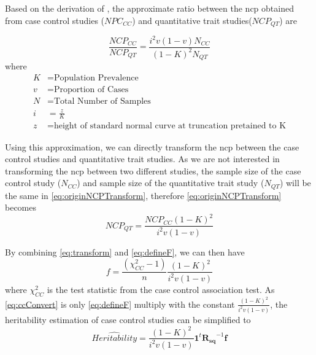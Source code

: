 \documentclass[12pt]{scrbook}
\begin{document}
Based on the derivation of \citet{Yang2010}, the approximate ratio between the \gls{ncp} obtained from case control studies ($NPC_{CC}$) and quantitative trait studies($NCP_{QT}$) are

\begin{equation}
\frac{NCP_{CC}}{NCP_{QT}} = \frac{i^2v(1-v)N_{CC}}{(1-K)^2N_{QT}}
\label{eq:originNCPTransform}
\end{equation}
where
\begin{align*}
K &= \text{Population Prevalence} \\
v &= \text{Proportion of Cases}\\
N &= \text{Total Number of Samples}\\
i &= \frac{z}{K}\\
z &= \text{height of standard normal curve at truncation pretained to K}
\end{align*}

Using this approximation, we can directly transform the \gls{ncp} between the case control studies and quantitative trait studies.
As we are not interested in transforming the \gls{ncp} between two different studies, the sample size of the case control study ($N_{CC}$) and sample size of the quantitative trait study ($N_{QT}$) will be the same in \cref{eq:originNCPTransform}, therefore \cref{eq:originNCPTransform} becomes
\begin{equation}
NCP_{QT} = \frac{NCP_{CC}(1-K)^2}{i^2v(1-v)}
\label{eq:transform}
\end{equation}

By combining \cref{eq:transform} and \cref{eq:defineF}, we can then have
\begin{equation}
f = \frac{(\chi^2_{CC}-1)}{n}\frac{(1-K)^2}{i^2v(1-v)}
\label{eq:ccConvert}
\end{equation}
where $\chi^2_{CC}$ is the test statistic from the case control association test.
As \cref{eq:ccConvert} is only \cref{eq:defineF} multiply with the constant $\frac{(1-K)^2}{i^2v(1-v)}$, the heritability estimation of case control studies can be simplified to 
\begin{equation}
\hat{Heritability} =\frac{(1-K)^2}{i^2v(1-v)} \boldsymbol{1}^t\boldsymbol{R_{sq}}^{-1}\boldsymbol{f}
\label{eq:caseControlHerit}
\end{equation}
\end{document}
